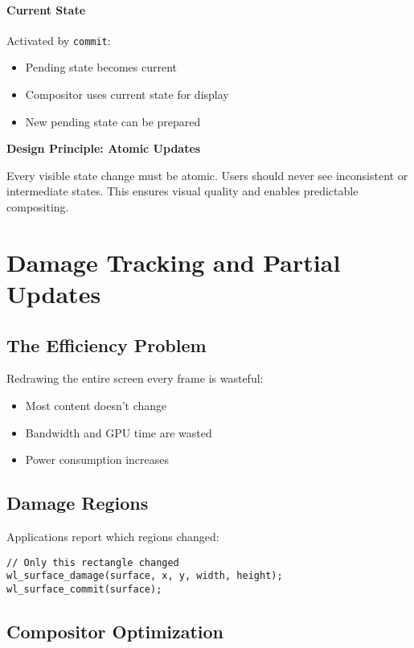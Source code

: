 \paragraph{Current State}
Activated by \texttt{commit}:
\begin{itemize}
    \item Pending state becomes current
    \item Compositor uses current state for display
    \item New pending state can be prepared
\end{itemize}

\begin{designbox}
\textbf{Design Principle: Atomic Updates}

Every visible state change must be atomic. Users should never see inconsistent or intermediate states. This ensures visual quality and enables predictable compositing.
\end{designbox}

\section{Damage Tracking and Partial Updates}

\subsection{The Efficiency Problem}

Redrawing the entire screen every frame is wasteful:
\begin{itemize}
    \item Most content doesn't change
    \item Bandwidth and GPU time are wasted
    \item Power consumption increases
\end{itemize}

\subsection{Damage Regions}

Applications report which regions changed:

\begin{lstlisting}[style=cstyle, caption=Reporting Damage]
// Only this rectangle changed
wl_surface_damage(surface, x, y, width, height);
wl_surface_commit(surface);
\end{lstlisting}

\subsection{Compositor Optimization}

